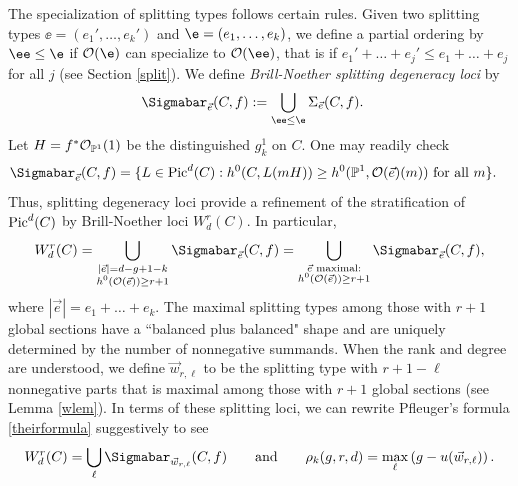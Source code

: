 The specialization of splitting types follows certain rules. Given two splitting types $\ee = (e_1', \ldots, e_k')$ and $\e = (e_1, \ldots, e_k)$, we define a partial ordering by $\ee \leq \e$ if $\O(\e)$ can specialize to $\O(\ee)$, that is if $e_1' + \ldots + e_j' \leq e_1 + \ldots + e_j$ for all $j$ (see Section \ref{split}).
We define \textit{Brill-Noether splitting degeneracy loci} by
\begin{align*}
\Sigmabar_{\vec{e}}(C, f) &:= \bigcup_{\ee \leq \e} \Sigma_{\vec{e}}(C, f).
\end{align*}
Let $H = f^*\mathcal{O}_{\mathbb{P}^1}(1)$ be the distinguished $g^1_k$ on $C$. One may readily check
\begin{align*}
\Sigmabar_{\vec{e}}(C, f) &= \{L \in \Pic^d(C) : h^0(C, L(mH)) \geq h^0(\pp^1, \O(\vec{e})(m)) \text{ for all } m\}.
\end{align*}
Thus, splitting degeneracy loci provide a refinement of the stratification of $\operatorname{Pic}^d(C)$ by Brill-Noether loci $W^r_d(C)$.
In particular,
\begin{equation} \label{W}\dcref{1.3}
\source{refined-brill-noether-theory-hurwitz-spaces}
W^r_d(C) = \bigcup_{\substack{|\vec{e}| = d - g + 1- k \\ h^0(\O(\vec{e})) \geq r+1}} \Sigmabar_{\vec{e}}(C, f) = \bigcup_{\substack{\vec{e} \text{ maximal:} \\ h^0(\O(\vec{e})) \geq r+ 1}}\Sigmabar_{\vec{e}}(C, f),
\end{equation}
where $|\vec{e}| = e_1 + \ldots + e_k$. The maximal splitting types among those with $r+1$ global sections have  a ``balanced plus balanced" shape and are uniquely determined by the number of nonnegative summands.
 When the rank and degree are understood, we define $\vec{w}_{r,\ell}$ to be the splitting type with $r+1 - \ell$ nonnegative parts that is maximal among those with $r+1$ global sections (see Lemma \ref{wlem}). In terms of these splitting loci, we can rewrite Pfleuger's formula \eqref{theirformula} suggestively to see
 \[W^r_d(C) = \bigcup_{\ell} \Sigmabar_{\vec{w}_{r,\ell}}(C, f) \qquad \text{and} \qquad \rho_k(g, r, d) = \max_{\ell} \left( g - u(\vec{w}_{r,\ell}) \right).\]

